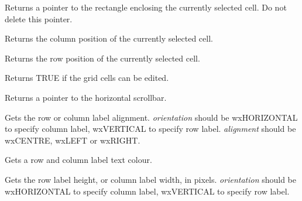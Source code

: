 \label{wxgridgetcurrentrect}


Returns a pointer to the rectangle enclosing the currently selected cell.
Do not delete this pointer.

\label{wxgridgetcursorcolumn}


Returns the column position of the currently selected cell.

\label{wxgridgetcursorrow}


Returns the row position of the currently selected cell.

\label{wxgridgeteditable}


Returns TRUE if the grid cells can be edited.

\label{wxgridgethorizscrollbar}


Returns a pointer to the horizontal scrollbar.

\label{wxgridgetlabelalignment}


Gets the row or column label alignment. {\it orientation} should
be wxHORIZONTAL to specify column label, wxVERTICAL to specify row label.\rtfsp
{\it alignment} should be wxCENTRE, wxLEFT or wxRIGHT.

\label{wxgridgetlabelbackgroundcolour}


Gets a row and column label text colour.

\label{wxgridgetlabelsize}


Gets the row label height, or column label width, in pixels. {\it orientation} should
be wxHORIZONTAL to specify column label, wxVERTICAL to specify row label.

